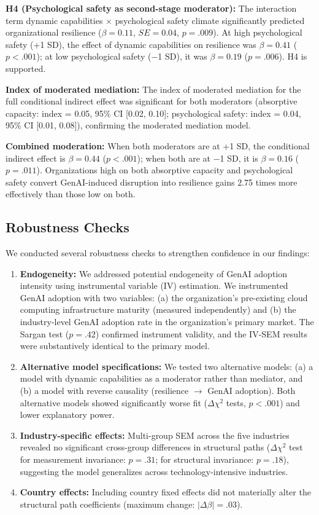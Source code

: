 \documentclass[12pt, a4paper]{article}
\begin{document}
\textbf{H4 (Psychological safety as second-stage moderator):} The interaction term dynamic capabilities $\times$ psychological safety climate significantly predicted organizational resilience ($\beta = 0.11$, $SE = 0.04$, $p = .009$). At high psychological safety (+1 SD), the effect of dynamic capabilities on resilience was $\beta = 0.41$ ($p < .001$); at low psychological safety ($-$1 SD), it was $\beta = 0.19$ ($p = .006$). H4 is supported.

\textbf{Index of moderated mediation:} The index of moderated mediation for the full conditional indirect effect was significant for both moderators (absorptive capacity: index = 0.05, 95\% CI [0.02, 0.10]; psychological safety: index = 0.04, 95\% CI [0.01, 0.08]), confirming the moderated mediation model.

\textbf{Combined moderation:} When both moderators are at +1 SD, the conditional indirect effect is $\beta = 0.44$ ($p < .001$); when both are at $-$1 SD, it is $\beta = 0.16$ ($p = .011$). Organizations high on both absorptive capacity and psychological safety convert GenAI-induced disruption into resilience gains 2.75 times more effectively than those low on both.

\subsection{Robustness Checks}

We conducted several robustness checks to strengthen confidence in our findings:

\begin{enumerate}[nosep]
    \item \textbf{Endogeneity:} We addressed potential endogeneity of GenAI adoption intensity using instrumental variable (IV) estimation. We instrumented GenAI adoption with two variables: (a) the organization's pre-existing cloud computing infrastructure maturity (measured independently) and (b) the industry-level GenAI adoption rate in the organization's primary market. The Sargan test ($p = .42$) confirmed instrument validity, and the IV-SEM results were substantively identical to the primary model.
    \item \textbf{Alternative model specifications:} We tested two alternative models: (a) a model with dynamic capabilities as a moderator rather than mediator, and (b) a model with reverse causality (resilience $\rightarrow$ GenAI adoption). Both alternative models showed significantly worse fit ($\Delta\chi^2$ tests, $p < .001$) and lower explanatory power.
    \item \textbf{Industry-specific effects:} Multi-group SEM across the five industries revealed no significant cross-group differences in structural paths ($\Delta\chi^2$ test for measurement invariance: $p = .31$; for structural invariance: $p = .18$), suggesting the model generalizes across technology-intensive industries.
    \item \textbf{Country effects:} Including country fixed effects did not materially alter the structural path coefficients (maximum change: $|\Delta\beta| = .03$).
\end{enumerate}
\end{document}
